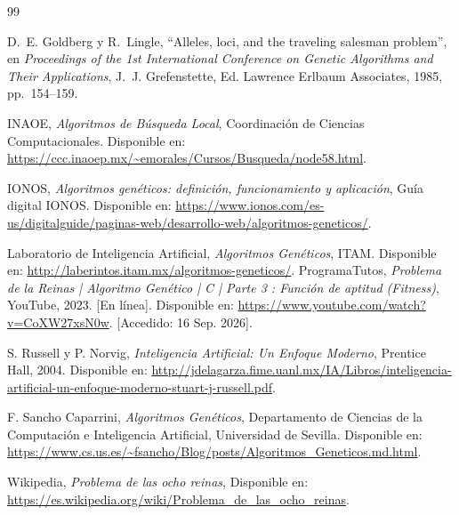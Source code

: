 \documentclass[11pt,a4paper,twocolumn]{article}
\begin{document}
\begin{thebibliography}{99}

D.~E. Goldberg y R.~Lingle, ``Alleles, loci, and the traveling salesman problem'', en \emph{Proceedings of the 1st International Conference on Genetic Algorithms and Their Applications}, J.~J. Grefenstette, Ed. Lawrence Erlbaum Associates, 1985, pp.~154--159.

INAOE, \emph{Algoritmos de Búsqueda Local}, Coordinación de Ciencias Computacionales. Disponible en: \url{https://ccc.inaoep.mx/~emorales/Cursos/Busqueda/node58.html}.

IONOS, \emph{Algoritmos genéticos: definición, funcionamiento y aplicación}, Guía digital IONOS. Disponible en: \url{https://www.ionos.com/es-us/digitalguide/paginas-web/desarrollo-web/algoritmos-geneticos/}.

Laboratorio de Inteligencia Artificial, \emph{Algoritmos Genéticos}, ITAM. Disponible en: \url{http://laberintos.itam.mx/algoritmos-geneticos/}.
ProgramaTutos, \emph{Problema de la Reinas | Algoritmo Genético | C | Parte 3 : Función de aptitud (Fitness)}, YouTube, 2023. [En línea]. Disponible en: \url{https://www.youtube.com/watch?v=CoXW27xsN0w}. [Accedido: 16 Sep. 2026].

S. Russell y P. Norvig, \emph{Inteligencia Artificial: Un Enfoque Moderno}, Prentice Hall, 2004. Disponible en: \url{http://jdelagarza.fime.uanl.mx/IA/Libros/inteligencia-artificial-un-enfoque-moderno-stuart-j-russell.pdf}.

F. Sancho Caparrini, \emph{Algoritmos Genéticos}, Departamento de Ciencias de la Computación e Inteligencia Artificial, Universidad de Sevilla. Disponible en: \url{https://www.cs.us.es/~fsancho/Blog/posts/Algoritmos_Geneticos.md.html}.

Wikipedia, \emph{Problema de las ocho reinas}, Disponible en: \url{https://es.wikipedia.org/wiki/Problema_de_las_ocho_reinas}.

\end{thebibliography}
\end{document}
